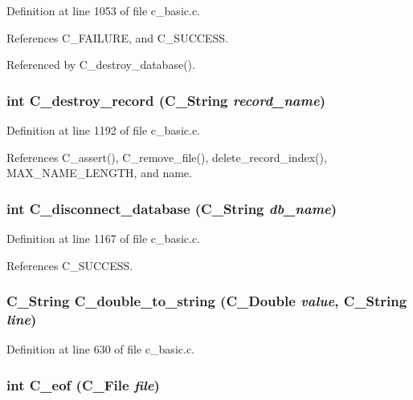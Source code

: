 Definition at line 1053 of file c\_\-basic.c.

References C\_\-FAILURE, and C\_\-SUCCESS.

Referenced by C\_\-destroy\_\-database().
\subsubsection{\setlength{\rightskip}{0pt plus 5cm}int C\_\-destroy\_\-record (\bf{C\_\-String} {\em record\_\-name})}\label{c__basic_8h_6ede0a4230cc5d957af94e50a40a80d0}




Definition at line 1192 of file c\_\-basic.c.

References C\_\-assert(), C\_\-remove\_\-file(), delete\_\-record\_\-index(), MAX\_\-NAME\_\-LENGTH, and name.
\subsubsection{\setlength{\rightskip}{0pt plus 5cm}int C\_\-disconnect\_\-database (\bf{C\_\-String} {\em db\_\-name})}\label{c__basic_8h_b5abdfe6c742ec90cb21001990e9a359}




Definition at line 1167 of file c\_\-basic.c.

References C\_\-SUCCESS.
\subsubsection{\setlength{\rightskip}{0pt plus 5cm}\bf{C\_\-String} C\_\-double\_\-to\_\-string (\bf{C\_\-Double} {\em value}, \bf{C\_\-String} {\em line})}\label{c__basic_8h_daabdc56919dd3dbe9df0c68df6ca0dd}




Definition at line 630 of file c\_\-basic.c.
\subsubsection{\setlength{\rightskip}{0pt plus 5cm}int C\_\-eof (\bf{C\_\-File} {\em file})}\label{c__basic_8h_fd5d61c706051dedc63ed2bf210c4370}




